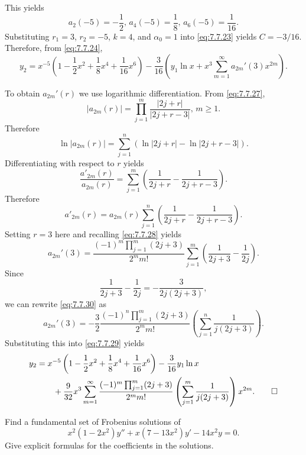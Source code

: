 \begin{solution}
This yields
\[
a_2(-5)=-\frac{1}{2},\,a_4(-5)=\frac{1}{8},\,a_6(-5)=\frac{1}{16}.
\]
Substituting $r_1=3$, $r_2=-5$, $k=4$, and $\alpha_0=1$   into
\eqref{eq:7.7.23}
yields $C=-3/16$.   Therefore, from \eqref{eq:7.7.24},
\begin{equation} \label{eq:7.7.29}
y_2=x^{-5} \left(1-\frac{1}{2}x^2+\frac{1}{8}x^4+\frac{1}{16}x^6\right)
-\frac{3}{16}
\left(y_1\ln x+x^3\sum_{m=1}^\infty a_{2m}'(3)x^{2m}\right).
\end{equation}

To obtain $a_{2m}'(r)$  we use logarithmic differentiation. From
\eqref{eq:7.7.27},
\[
|a_{2m}(r)|=\prod_{j=1}^m\frac{|2j+r|}{|2j+r-3|},\,m\ge1.
\]
Therefore
\[
\ln |a_{2m}(r)|=\sum^n_{j=1} \left(\ln |2j+r|-\ln|2j+r-3|\right).
\]
Differentiating  with respect to $r$ yields
\[
\frac{a'_{2m}(r)}{a_{2m}(r)}=\sum^m_{j=1} \left(\frac{1}{2j+r}-\frac{1}{2j+r-3}\right).
\]
Therefore
\[
a'_{2m}(r)=a_{2m}(r) \sum^n_{j=1} \left(\frac{1}{2j+r}-\frac{1}{2j+r-3}\right).
\]
Setting $r=3$ here and recalling \eqref{eq:7.7.28} yields
\begin{equation} \label{eq:7.7.30}
a_{2m}'(3)=\frac{(-1)^m\prod_{j=1}^m(2j+3)}{2^mm!}\sum_{j=1}^m
\left(\frac{1}{2j+3}-\frac{1}{2j}\right).
\end{equation}
Since
\[
\frac{1}{2j+3}-\frac{1}{2j}=-\frac{3}{2j(2j+3)},
\]
we can rewrite \eqref{eq:7.7.30} as
\[
a_{2m}'(3)=-\frac{3}{2}\frac{(-1)^n\prod_{j=1}^m(2j+3)}{2^mm!}
\left(\sum_{j=1}^n\frac{1}{j(2j+3)}\right).
\]
Substituting this into \eqref{eq:7.7.29} yields
\begin{align*}
y_2&=x^{-5}
\left(1-\frac{1}{2}x^2+\frac{1}{8}x^4+\frac{1}{16}x^6\right)
-\frac{3}{16}y_1\ln x \\
&\qquad{} +\frac{9}{32}
x^3\sum_{m=1}^\infty
\frac{(-1)^m\prod_{j=1}^m(2j+3)}{2^mm!}\left(\sum_{j=1}^m\frac{1}{j(2j+3)}\right) x^{2m}.\qedhere
\end{align*}
\end{solution}

\begin{example}\label{example:7.7.4}
Find a fundamental set of Frobenius  solutions of
\[
x^2(1-2x^2)y''+x(7-13x^2)y'-14x^2y=0.
\]
Give explicit formulas for the coefficients in the solutions.
\end{example}

